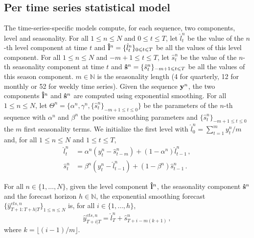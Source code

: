 \documentclass[letterpaper]{article} %
\newcommand{\ts}{y}
\newcommand{\fullts}{{\bf \ts}}
\newcommand{\lvl}{\hat{l}}
\newcommand{\fulllvl}{{\bf \lvl}}
\newcommand{\seas}{\hat{s}}
\newcommand{\fullseas}{{\bf \seas}}
\newcommand{\lsmooth}{\alpha}
\newcommand{\ssmooth}{\beta}
\newcommand{\lag}{h}
\newcommand{\etspred}{\hat{y}}
\begin{document}

\subsection{Per time series statistical model}
The time-series-specific models compute, for each sequence, two components,  level  and  seasonality. For all $1\leqslant n \leqslant N$ and $0\leqslant t \leqslant T$, let $\lvl_t^n$ be the value of the $n$-th level component at time $t$ and  $\fulllvl^n = \{\lvl_t^n\}_{0\leqslant t \leqslant T}$ be all the values of this level component. For all $1\leqslant n \leqslant N$ and $-m+1\leqslant t \leqslant T$, let $\seas_t^n$ be the value of the $n$-th seasonality component at time $t$ and  $\fullseas^n = \{\seas_t^n\}_{-m+1\leqslant t \leqslant T}$ be all the values of this season component. $m \in \mathbb{N}$ is the seasonality length (4 for quarterly, 12 for monthly or 52 for weekly time series). Given the sequence $\fullts^n$, the two components  $\fulllvl^n$ and $\fullseas^n$ are computed using exponential smoothing.
For all $1\leqslant n \leqslant N$, let $\Theta^n = \{\alpha^n, \gamma^n,\{\seas_t^n\}_{-m+1\leqslant t \leqslant 0}\}$ be the parameters of the $n$-th sequence with $\lsmooth^n$ and $\ssmooth^n$ the positive smoothing parameters and $\{\seas_t^n\}_{-m+1\leqslant t \leqslant 0}$ the $m$ first seasonality terms. We initialize the first level with $\lvl^n_{0} = \sum_{t = 1}^m \ts^n_{t}/m$ and, for all $1\leqslant n \leqslant N$ and $1\leqslant t \leqslant T$,
\begin{align*}
    \lvl^n_{t} &= \lsmooth^n (\ts^n_t - \seas^n_{t-m}) + (1- \lsmooth^n)\lvl^n_{t-1}\,, \\
    \seas^n_t &= \ssmooth^n (\ts^n_t - \lvl^n_{t-1}) + (1 - \ssmooth^n)\seas^n_{t-1}\,. 
\end{align*}

For all $n \in \{1,\ldots,N\}$, given the level component $\fulllvl^n$, the seasonality component $\fullseas^n$ and the forecast horizon $\lag \in \mathbb{N}$, the exponential smoothing forecast $\{\etspred^{ets,n}_{T+1:T+\lag|T}\}_{1\leqslant n \leqslant N}$ is, for all $i \in \{1,\ldots,\lag\}$,
$$
\etspred^{ets,n}_{T+i|T} = \lvl^n_T + \seas^n_{T+i-m(k+1)}\,,
$$
where $k = \lfloor(i-1)/m\rfloor$. 
\end{document}
